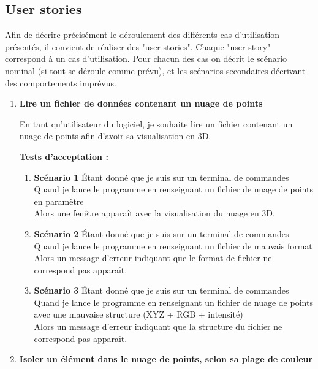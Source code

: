 \documentclass[12pt,titlepage,french]{article}
\begin{document}
\break
\subsection*{User stories}

Afin de décrire précisément le déroulement des différents cas d'utilisation présentés, il convient de réaliser des "user stories".
Chaque "user story" correspond à un cas d'utilisation.
Pour chacun des cas on décrit le scénario nominal (si tout se déroule comme prévu), et les scénarios secondaires décrivant des comportements imprévus.
\begin{enumerate}
    \item \textbf{Lire un fichier de données contenant un nuage de points}

En tant qu'utilisateur du logiciel, je souhaite lire un fichier contenant un nuage de points afin d'avoir sa visualisation en 3D.

\textbf{Tests d'acceptation :}

\begin{enumerate}
    \item \textbf{Scénario 1}
Étant donné que je suis sur un terminal de commandes\\
Quand je lance le programme en renseignant un fichier de nuage de points en paramètre\\
Alors une fenêtre apparaît avec la visualisation du nuage en 3D.

    \item \textbf{Scénario 2}
Étant donné que je suis sur un terminal de commandes\\
Quand je lance le programme en renseignant un fichier de mauvais format\\
Alors un message d'erreur indiquant que le format de fichier ne correspond pas apparaît.

    \item \textbf{Scénario 3}
Étant donné que je suis sur un terminal de commandes\\
Quand je lance le programme en renseignant un fichier de nuage de points avec une mauvaise structure (XYZ + RGB + intensité)\\
Alors un message d'erreur indiquant que la structure du fichier ne correspond pas apparaît.

\end{enumerate}

    \item \textbf{Isoler un élément dans le nuage de points, selon sa plage de couleur}


\end{enumerate}
\end{document}
